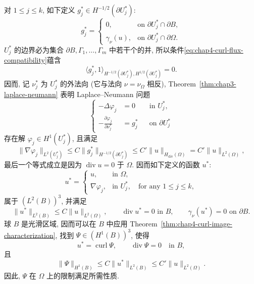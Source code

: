 \begin{Proof}
\begin{itemize}
 对 $1\leq j\leq k$, 如下定义 $g_j^*\in H^{-1/2}(\partial U_j^*)$:
 \[
  g_j^*=\begin{cases}
  0,&\text{on }\partial U_j^*\cap\partial B,\\
  \gamma_\nu(u),&\text{on }\partial U_j^*\cap\partial\Omega.
  \end{cases}
 \]
 $U_j^*$ 的边界必为集合 $\partial B,\Gamma_1,\ldots,\Gamma_m$ 中若干个的并,
 所以条件\eqref{eq:chap4-curl-flux-compatibility}蕴含
 \[
  \langle g_j^*,1\rangle_{H^{-1/2}(\partial U_j^*),H^{1/2}(\partial U_j^*)}=0.
 \]
 因而, 记 $\nu_j^*$ 为 $U_j^*$ 的外法向 (它与法向 $\nu=\nu_\Omega$ 相反),
 Theorem~\ref{thm:chap3-laplace-neumann}
 表明 Laplace--Neumann 问题
 \[
 \left\{
 \begin{aligned}
 -\Delta\varphi_j&=0&&\text{in }U_j^*,\\
 -\frac{\partial\varphi_j}{\partial\nu_j^*}&=g_j^*&&\text{on }\partial U_j^*
 \end{aligned}
 \right.
 \]
 存在解 $\varphi_j\in H^1(U_j^*)$, 且满足
 \[
  \|\nabla\varphi_j\|_{L^2(U_j^*)}
  \leq C\|g_j^*\|_{H^{-1/2}(\partial U_j^*)}
  \leq C'\|u\|_{H_{\operatorname{div}}(\Omega)}
  =C'\|u\|_{L^2(\Omega)},
 \]
 最后一个等式成立是因为 $\operatorname{div}u=0$ 于 $\Omega$.
 因而如下定义的函数 $u^*$:
 \[
  u^*=\begin{cases}
  u,&\text{in }\Omega,\\
  \nabla\varphi_j,&\text{in }U_j^*,\quad\text{for any }1\leq j\leq k,
  \end{cases}
 \]
 属于 $(L^2(B))^3$, 并满足
 \[
  \|u^*\|_{L^2(B)}\leq C\|u\|_{L^2(\Omega)},
  \qquad \operatorname{div}u^*=0\text{ in }B,
  \qquad \gamma_\nu(u^*)=0\text{ on }\partial B.
 \]
 球 $B$ 是光滑区域, 因而可以在 $B$ 中应用
 Theorem~\ref{thm:chap4-curl-image-characterization}, 找到
 $\Psi\in(H^1(B))^3$, 使得
 \[
  u^*=\operatorname{curl}\Psi,\qquad\operatorname{div}\Psi=0\quad\text{in }B,
 \]
 且
 \[
  \|\Psi\|_{H^1(B)}\leq C\|u^*\|_{L^2(B)}
  \leq C'\|u\|_{L^2(\Omega)}.
 \]
 因此, $\Psi$ 在 $\Omega$ 上的限制满足所需性质.


\end{itemize}
\end{Proof}

